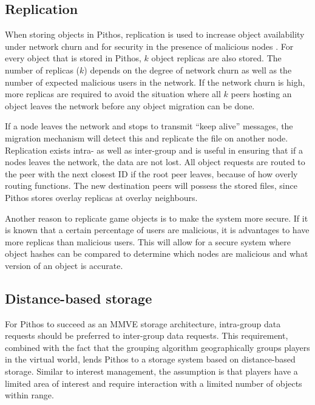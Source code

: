 \documentclass[10pt,a4paper,conference]{IEEEtran}
\begin{document}
\subsection{Replication}
\label{store_retrieve}

When storing objects in Pithos, replication is used to increase object availability under network churn and for security in the presence of malicious
nodes \cite{storage_and_chaching_PAST}. For every object that is stored in Pithos, $k$ object replicas are also stored. The number of replicas ($k$)
depends on the degree of network churn as well as the number of expected malicious users in the network. If the network churn is high, more replicas
are required to avoid the situation where all $k$ peers hosting an object leaves the network before any object migration can be done.

If a node leaves the network and stops to transmit ``keep alive'' messages, the migration mechanism will detect this and replicate the file on
another node. Replication exists intra- as well as inter-group and is useful in ensuring that if a nodes leaves the network, the data are not lost.
All object requests are routed to the peer with the next closest ID if the root peer leaves, because of how overly routing functions. The new
destination peers will possess the stored files, since Pithos stores overlay replicas at overlay neighbours.

Another reason to replicate game objects is to make the system more secure. If it is known that a certain percentage of users are malicious, it is
advantages to have more replicas than malicious users. This will allow for a secure system where object hashes can be compared to determine which
nodes are malicious and what version of an object is accurate.

\subsection{Distance-based storage}
\label{distance_based}

For Pithos to succeed as an MMVE storage architecture, intra-group data requests should be preferred to inter-group data requests. This requirement,
combined with the fact that the grouping algorithm geographically groups players in the virtual world, lends Pithos to a storage system based on
distance-based storage. Similar to interest management, the assumption is that players have a limited area of interest and require interaction with a
limited number of objects within range.
\end{document}

